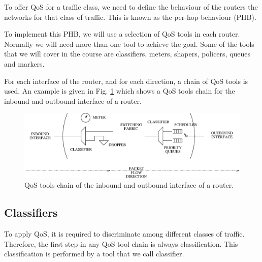 To offer QoS for a traffic class, we need to define the behaviour of the routers the networks for that class of traffic.
This is known as the per-hop-behaviour (PHB).

To implement this PHB, we will use a selection of QoS tools in each router.
Normally we will need more than one tool to achieve the goal.
Some of the tools that we will cover in the course are classifiers, meters, shapers, policers, queues and markers.

For each interface of the router, and for each direction, a chain of QoS tools is used.
An example is given in Fig. \ref{fig:qos-chain} which shows a QoS tools chain for the inbound and outbound interface of a router.

\begin{figure}[h]
\centering
\includegraphics[width=\linewidth]{figures/qos_chain.eps}
\caption{QoS tools chain of the inbound and outbound interface of a router.}
\label{fig:qos-chain}
\end{figure}

\subsection{Classifiers}

To apply QoS, it is required to discriminate among different classes of traffic.
Therefore, the first step in any QoS tool chain is always classification.
This classification is performed by a tool that we call classifier.

